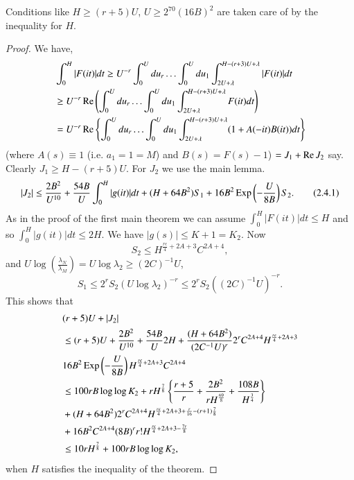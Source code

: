 \begin{remark*}
Conditions like $H \geq (r+5) U$, $U \geq 2^{70} (16B)^2$ are taken care of by the inequality for $H$.
\end{remark*}

\begin{proof}
We have,
\begin{align*}
& \int^H_0 |F(it)| dt \geq U^{-r} \int^U_0 du_r \ldots \int^U_0 du_1 \int^{H-(r+3)U+\lambda}_{2U+\lambda} |F(it)| dt\\
& \geq  U^{-r} \operatorname{Re} \left(\int^U_0 du_r \ldots\int^U_0 du_1 \int^{H-(r+3)U+\lambda}_{2U+\lambda} F(it) dt\right)\\
& = U^{-r} \operatorname{Re} \left\{\int^U_0 du_r \ldots \int^U_0 du_1 \int^{H-(r+3)U+ \lambda}_{2U+\lambda} (1+ A (-it) B (it)) dt \right\}
\end{align*}
(where $A(s) \equiv 1$ (i.e. $a_1 = 1 = M$) and $B(s) = F(s) -1$) $=J_1 + \operatorname{Re} J_2 $ say. Clearly $J_1 \geq H - (r+5) U$. For $J_2$ we use the main lemma.
\begin{equation*}
|J_2| \leq \frac{2B^2}{U^{10}} + \frac{54B}{U} \int^H_0 |g(it)| dt + (H+64 B^2) S_1 + 16B^2 \operatorname{Exp} \left( -\frac{U}{8B}\right) S_2. \tag{2.4.1}\label{c2:eq2.4.1}
\end{equation*}
As in the proof of the first main theorem we can assume $\int^H_0 |F(it)| dt \leq H$ and so $\int^H_0 |g(it)| dt \leq 2 H$. We have $|g(s)| \leq K+1 = K_2$. Now
$$
S_2 \leq H^{\frac{r\epsilon}{4} + 2 A + 3} C^{2A+4},
$$
and $U\log \left(\frac{\lambda_N}{\lambda_M} \right) = U\log \lambda_2 \geq (2C)^{-1} U$,
$$
S_1 \leq 2^r S_2 (U \log \lambda_2)^{-r} \leq 2^r S_2 ((2C)^{-1} U)^{-r}.
$$
This shows that
\begin{align*}
& (r+5) U + |J_2|\\
& \leq (r+5) U + \frac{2B^2}{U^{10}} + \frac{54B}{U} 2H + \frac{(H+ 64 B^2)}{(2C^{-1} U)^r} 2^r C^{2A+4} H^{\frac{r\epsilon}{4} + 2 A + 3}\\
& 16 B^2 \operatorname{Exp} \left(-\frac{U}{8B} \right) H^{\frac{r\epsilon}{4} + 2 A + 3} C^{2A+4}\\
& \leq 100r B \log \log K_2 + r H^{\frac{7}{8}} \left\{\frac{r+5}{r} + \frac{2B^2}{rH^{\frac{69}{8}}} + \frac{108B}{H^{\frac{3}{4}}} \right\}\\
& + (H + 64 B^2) 2^r C^{2A+4} H^{\frac{r\epsilon}{4} + 2 A + 3 + \frac{r}{16} - (r+1) \frac{7}{8}}  \\
& +16B^2 C^{2A+4} (8B)^r r !  H^{\frac{r\epsilon}{4} + 2A + 3 -\frac{7r}{8}}\\
& \leq 10 r H^{\frac{7}{8}} + 100 r B \log \log K_2,
\end{align*}\pageoriginale
when $H$ satisfies the inequality of the theorem.
\end{proof}


